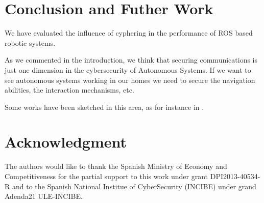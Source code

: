 \documentclass[journal,twoside]{JoPhA}
\begin{document}
\section{Conclusion and Futher Work}

We have evaluated the influence of cyphering in the performance of ROS based robotic systems.

As we commented in the introduction, we think that securing communications is just one dimension in  the cybersecurity of Autonomous Systems. If we want to see autonomous systems working in our homes we need to secure the navigation abilities, the interaction mechanisms, etc. 
 
Some works have been sketched in this area, as for instance in \cite{Guiochet2016}.




\section*{Acknowledgment}
The authors would  like to thank the Spanish Ministry of Economy and Competitiveness for the partial support to this work under grant DPI2013-40534-R and to the Spanish National Institue of CyberSecurity (INCIBE) under grand Adenda21 ULE-INCIBE.

 

\end{document}
